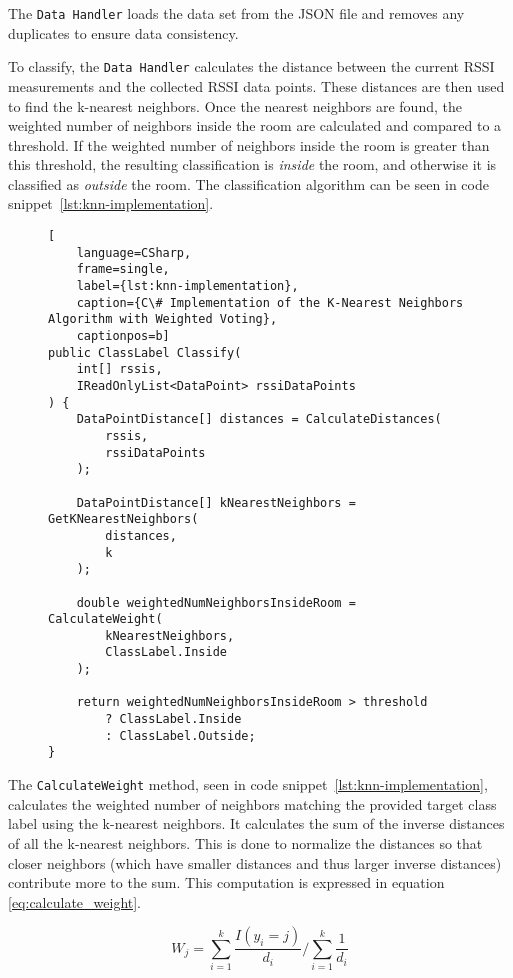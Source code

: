
The \texttt{Data Handler} loads the data set from the JSON file and removes any duplicates to ensure data consistency.

To classify, the \texttt{Data Handler} calculates the distance between the current RSSI measurements and the collected RSSI data points.
These distances are then used to find the k-nearest neighbors.
Once the nearest neighbors are found, the weighted number of neighbors inside the room are calculated and compared to a threshold.
If the weighted number of neighbors inside the room is greater than this threshold, the resulting classification is \textit{inside} the room, and otherwise it is classified as \textit{outside} the room.
The classification algorithm can be seen in code snippet~\ref{lst:knn-implementation}.

\begin{figure}[H]
\begin{lstlisting}[
	language=CSharp, 
	frame=single, 
	label={lst:knn-implementation},
	caption={C\# Implementation of the K-Nearest Neighbors Algorithm with Weighted Voting}, 
	captionpos=b] 
public ClassLabel Classify(
	int[] rssis, 
	IReadOnlyList<DataPoint> rssiDataPoints
) {
	DataPointDistance[] distances = CalculateDistances(
		rssis, 
		rssiDataPoints
	);

	DataPointDistance[] kNearestNeighbors = GetKNearestNeighbors(
		distances,
		k
	);

	double weightedNumNeighborsInsideRoom = CalculateWeight(
		kNearestNeighbors,
		ClassLabel.Inside
	);

	return weightedNumNeighborsInsideRoom > threshold 
		? ClassLabel.Inside 
		: ClassLabel.Outside;
}
\end{lstlisting}
\end{figure}

The \texttt{CalculateWeight} method, seen in code snippet~\ref{lst:knn-implementation}, calculates the weighted number of neighbors matching the provided target class label using the k-nearest neighbors.
It calculates the sum of the inverse distances of all the k-nearest neighbors. This is done to normalize the distances so that closer neighbors (which have smaller distances and thus larger inverse distances) contribute more to the sum.
This computation is expressed in equation \ref{eq:calculate_weight}.

\begin{equation}\label{eq:calculate_weight}
W_j = \sum_{i=1}^{k} \frac{I(y_i = j)}{d_i} \Bigg/ \sum_{i=1}^{k} \frac{1}{d_i}
\end{equation}

